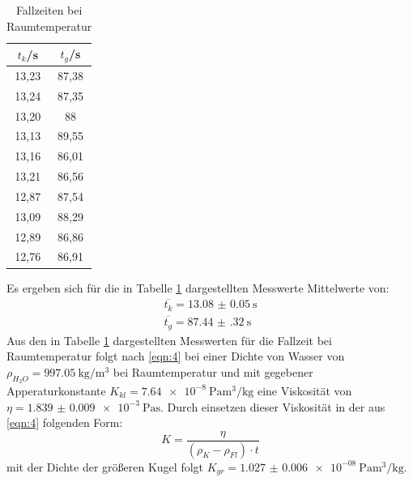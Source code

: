 \begin{table}[h]
  \centering
  \caption{Fallzeiten bei Raumtemperatur}
  \label{tab:3}
  \begin{tabular}{c c}
    \toprule
    $t_{k}$/\si{\second} & $t_{g}$/\si{\second} \\
    \midrule
    13,23 & 87,38 \\
    13,24 & 87,35 \\
    13,20 & 88\\
    13,13 & 89,55 \\
    13,16 & 86,01 \\
    13,21 & 86,56 \\
    12,87 & 87,54 \\
    13,09 & 88,29 \\
    12,89 & 86,86 \\
    12,76 & 86,91 \\
    \bottomrule
  \end{tabular}
\end{table}
Es ergeben sich für die in Tabelle \ref{tab:3} dargestellten Messwerte Mittelwerte von:
\begin{equation*}
  \begin{split}
    \overline{t_{k}} = \SI{13.08(5)}{\second}\\
    \overline{t_{g}} = \SI{87.44(32)}{\second}
  \end{split}
\end{equation*}
Aus den in Tabelle \ref{tab:3} dargestellten Messwerten für die Fallzeit bei Raumtemperatur
folgt nach \eqref{eqn:4} bei einer Dichte von Wasser von $\rho_{H_2O} = \SI[per-mode=reciprocal]{997.05}{\kilo\gram\per\cubic\metre}$ \cite[1]{LitEta} bei Raumtemperatur
und mit gegebener Apperaturkonstante $K_{kl} = \SI[per-mode=reciprocal]{7.64e-8}{\pascal\cubic\metre\per\kilo\gram}$ \cite[3]{anleitung}
eine Viskosität von $\eta = \SI{1.839(9)e-3}{\pascal\second}$.
Durch einsetzen dieser Viskosität in der aus \eqref{eqn:4} folgenden Form:
\begin{equation}
  K = \frac{\eta}{(\rho_K - \rho_{Fl}) \cdot t}
\end{equation}
mit der Dichte der größeren Kugel folgt $K_{gr} = \SI[per-mode=reciprocal]{1.027(6)e-08}{\pascal\cubic\metre\per\kilo\gram}$.
